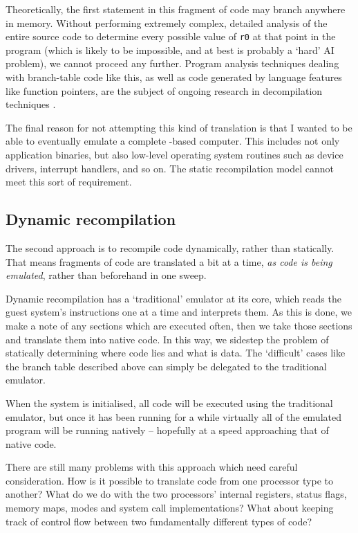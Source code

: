 Theoretically, the first statement in this fragment of code may branch anywhere in memory. Without performing extremely complex, detailed analysis of the entire source code to determine every possible value of {\tt r0} at that point in the program (which is likely to be impossible, and at best is probably a `hard' AI problem), we cannot proceed any further. Program analysis techniques dealing with branch-table code like this, as well as code generated by language features like function pointers, are the subject of ongoing research in decompilation techniques \cite{Mycroft99}.

The final reason for not attempting this kind of translation is that I wanted to be able to eventually emulate a complete \arm-based computer. This includes not only application binaries, but also low-level operating system routines such as device drivers, interrupt handlers, and so on. The static recompilation model cannot meet this sort of requirement.

\subsection{Dynamic recompilation}

The second approach is to recompile code dynamically, rather than statically. That means fragments of code are translated a bit at a time, {\it as code is being emulated}, rather than beforehand in one sweep.

Dynamic recompilation has a `traditional' emulator at its core, which reads the guest system's instructions one at a time and interprets them. As this is done, we make a note of any sections which are executed often, then we take those sections and translate them into native code. In this way, we sidestep the problem of statically determining where code lies and what is data. The `difficult' cases like the branch table described above can simply be delegated to the traditional emulator.

When the system is initialised, all code will be executed using the traditional emulator, but once it has been running for a while virtually all of the emulated program will be running natively -- hopefully at a speed approaching that of native code.

There are still many problems with this approach which need careful consideration. How is it possible to translate code from one processor type to another? What do we do with the two processors' internal registers, status flags, memory maps, modes and system call implementations? What about keeping track of control flow between two fundamentally different types of code?

